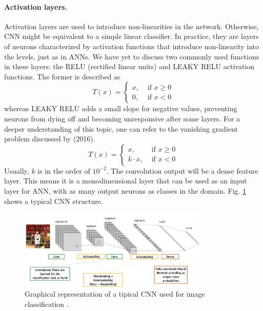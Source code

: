 \paragraph{Activation layers.} Activation layers are used to introduce non-linearities in the network. Otherwise, CNN might be equivalent to a simple linear classifier. In practice, they are layers of neurons characterized by activation functions that introduce non-linearity into the levels, just as in ANNs. We have yet to discuss two commonly used functions in these layers: the RELU (rectified linear units) and LEAKY RELU activation functions. The former is described as
\begin{equation}
    \label{eq:RELU}
    T(x)=\left\{\begin{array}{rr}
    x, & \text { if } x \geq 0 \\
    0, & \text { if } x<0
\end{array}\right.
\end{equation}
whereas LEAKY RELU adds a small slope for negative values, preventing neurons from dying off and becoming unresponsive after some layers. For a deeper understanding of this topic, one can refer to the vanishing gradient problem discussed by \citeauthor{goodfellow_deep_2016} (2016).
\begin{equation}
    \label{eq:LEAKYRELU}
    T(x)=\left\{\begin{array}{rr}
    x, & \text { if } x \geq 0 \\
    k\cdot x, & \text { if } x<0
\end{array}\right.
\end{equation}
Usually, $k$ is in the order of $10^{-2}$.
The convolution output will be a dense feature layer. This means it is a monodimensional layer that can be used as an input layer for ANN, with as many output neurons as classes in the domain. Fig. \ref{fig:typicalcnn} shows a typical CNN structure.
\begin{figure}
    \centering
    \includegraphics[width=0.8\textwidth]{Images/CNNtypical.png}
    \caption[CNN general structure.]{Graphical representation of a tipical CNN used for image classification \cite{giacomo_boracchi_convolutional_2021}.}
    \label{fig:typicalcnn}
\end{figure}


